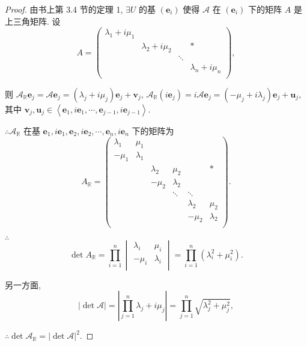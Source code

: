 \documentclass[color=black,device=normal,lang=cn,mode=geye]{elegantnote}
\begin{document}
\begin{proof}
    由书上第 3.4 节的定理 1, $\exists U$ 的基 $(\boldsymbol{e}_i)$ 使得 $\mathcal{A}$ 在 $(\boldsymbol{e}_i)$ 下的矩阵 $A$ 是上三角矩阵. 设
    \[A=\begin{pmatrix}
        \lambda_1+i\mu_1 \\
        & \lambda_2+i\mu_2 && * \\
        && \ddots \\
        &&& \lambda_n+i\mu_n \\
    \end{pmatrix},\]

    则 $\mathcal{A}_\mathbb{R}\boldsymbol{e}_j=\mathcal{A}\boldsymbol{e}_j=(\lambda_j+i\mu_j)\boldsymbol{e}_j+\boldsymbol{v}_j$, $\mathcal{A}_\mathbb{R}(i\boldsymbol{e}_j)=i\mathcal{A}\boldsymbol{e}_j=(-\mu_j+i\lambda_j)\boldsymbol{e}_j+\boldsymbol{u}_j$, 其中 $\boldsymbol{v}_j,\boldsymbol{u}_j\in\left<\boldsymbol{e}_1,i\boldsymbol{e}_1,\cdots,\boldsymbol{e}_{j-1},i\boldsymbol{e}_{j-1}\right>$.
    
    $\therefore\mathcal{A}_\mathbb{R}$ 在基 $\boldsymbol{e}_1,i\boldsymbol{e}_1,\boldsymbol{e}_2,i\boldsymbol{e}_2,\cdots,\boldsymbol{e}_n,i\boldsymbol{e}_n$ 下的矩阵为
    \[A_\mathbb{R}=\begin{pmatrix}
        \lambda_1 & \mu_1 \\
        -\mu_1 & \lambda_1 \\
        && \lambda_2 & \mu_2 && * \\
        && -\mu_2 & \lambda_2 \\
        &&& \ddots & \ddots \\
        &&&& \lambda_2 & \mu_2 \\
        &&&& -\mu_2 & \lambda_2 \\
    \end{pmatrix}.\]

    $\therefore$
    \[\det A_\mathbb{R}=\prod\limits_{i=1}^n\begin{vmatrix}
        \lambda_i & \mu_i \\
        -\mu_i & \lambda_i \\
    \end{vmatrix}=\prod\limits_{i=1}^n(\lambda_i^2+\mu_i^2).\]

    另一方面,
    \[|\det\mathcal{A}|=\left|\prod\limits_{j=1}^n\lambda_j+i\mu_j\right|=\prod\limits_{j=1}^n\sqrt{\lambda_j^2+\mu_j^2},\]

    $\therefore\det\mathcal{A}_\mathbb{R}=|\det\mathcal{A}|^2$.
\end{proof}
\end{document}
